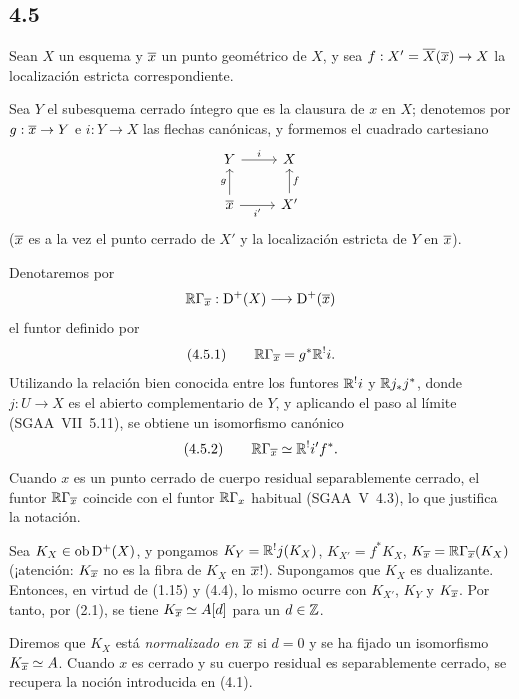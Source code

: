 \subsection*{4.5}
Sean $X$ un esquema y $\overline{x}$ un punto geométrico de $X$, y sea $f:X'=\overline{X}(\overline{x})\to X$ la localización estricta correspondiente.

Sea $Y$ el subesquema cerrado íntegro que es la clausura de $x$ en $X$; denotemos por $g:\overline{x}\to Y$ e $i:Y\to X$ las flechas canónicas, y formemos el cuadrado cartesiano
\[
\begin{tikzcd}
Y \arrow[r,"i"] & X \\
\ol{x} \arrow[u,"g"] \arrow[r,"i'"'] & X' \arrow[u,"f"']
\end{tikzcd}
\]
($\overline{x}$ es a la vez el punto cerrado de $X'$ y la localización estricta de $Y$ en $\overline{x}$).

Denotaremos por
\[
\mathbb{R}\Gamma_{\overline{x}}:\mathrm{D}^+(X)\longrightarrow \mathrm{D}^+(\overline{x})
\]
el funtor definido por
\[
(4.5.1)\qquad \mathbb{R}\Gamma_{\overline{x}}=g^*\mathbb{R}^{!}i.
\]
Utilizando la relación bien conocida entre los funtores $\mathbb{R}^{!}i$ y $\mathbb{R} j_*j^*$, donde $j:U\to X$ es el abierto complementario de $Y$, y aplicando el paso al límite (SGAA~VII~5.11), se obtiene un isomorfismo canónico
\[
(4.5.2)\qquad \mathbb{R}\Gamma_{\overline{x}}\simeq\mathbb{R}^{!}i' f^*.
\]
Cuando $x$ es un punto cerrado de cuerpo residual separablemente cerrado, el funtor $\mathbb{R}\Gamma_{\overline{x}}$ coincide con el funtor $\mathbb{R}\Gamma_x$ habitual (SGAA~V~4.3), lo que justifica la notación.

Sea $K_X\in\operatorname{ob}\mathrm{D}^+(X)$, y pongamos $K_Y=\mathbb{R}^{!}j(K_X)$, $K_{X'}=f^*K_X$, $K_{\overline{x}}=\mathbb{R}\Gamma_{\overline{x}}(K_X)$ (¡atención: $K_{\overline{x}}$ no es la fibra de $K_X$ en $\overline{x}$!). Supongamos que $K_X$ es dualizante. Entonces, en virtud de (1.15) y (4.4), lo mismo ocurre con $K_{X'}$, $K_Y$ y $K_{\overline{x}}$. Por tanto, por (2.1), se tiene $K_{\overline{x}}\simeq A[d]$ para un $d\in\mathbb{Z}$.

Diremos que $K_X$ está \emph{normalizado en $\overline{x}$} si $d=0$ y se ha fijado un isomorfismo $K_{\overline{x}}\simeq A$. Cuando $x$ es cerrado y su cuerpo residual es separablemente cerrado, se recupera la noción introducida en (4.1).

